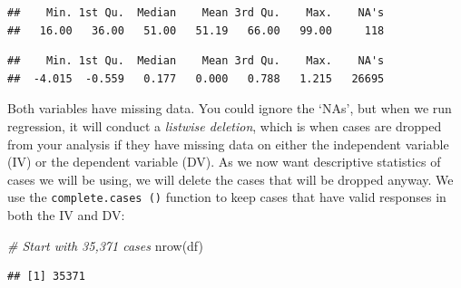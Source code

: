 \documentclass[
]{book}
\newenvironment{Shaded}{\begin{snugshade}}{\end{snugshade}}
\newcommand{\CommentTok}[1]{\textcolor[rgb]{0.56,0.35,0.01}{\textit{#1}}}
\newcommand{\FunctionTok}[1]{\textcolor[rgb]{0.00,0.00,0.00}{#1}}
\newcommand{\NormalTok}[1]{#1}
\newcommand{\OtherTok}[1]{\textcolor[rgb]{0.56,0.35,0.01}{#1}}
\newcommand{\SpecialCharTok}[1]{\textcolor[rgb]{0.00,0.00,0.00}{#1}}
\begin{document}
\begin{verbatim}
##    Min. 1st Qu.  Median    Mean 3rd Qu.    Max.    NA's 
##   16.00   36.00   51.00   51.19   66.00   99.00     118
\end{verbatim}

\begin{Shaded}
\end{Shaded}

\begin{verbatim}
##    Min. 1st Qu.  Median    Mean 3rd Qu.    Max.    NA's 
##  -4.015  -0.559   0.177   0.000   0.788   1.215   26695
\end{verbatim}

Both variables have missing data. You could ignore the `NAs', but when we run regression, it will conduct a \emph{listwise deletion}, which is when cases are dropped from your analysis if they have missing data on either the independent variable (IV) or the dependent variable (DV). As we now want descriptive statistics of cases we will be using, we will delete the cases that will be dropped anyway. We use the \texttt{complete.cases\ ()} function to keep cases that have valid responses in both the IV and DV:

\begin{Shaded}
\begin{Highlighting}[]
\CommentTok{\# Start with 35,371 cases}
\FunctionTok{nrow}\NormalTok{(df) }
\end{Highlighting}
\end{Shaded}

\begin{verbatim}
## [1] 35371
\end{verbatim}

\begin{Shaded}
\end{Shaded}
\end{document}
